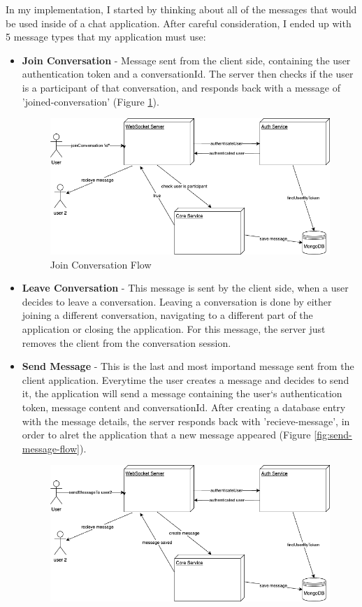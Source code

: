 In my implementation, I started by thinking about all of the messages that would be used inside of a chat application. After careful consideration, I ended up with 5 message types that my application must use:
\begin{itemize}
    \item \textbf{Join Conversation} - Message sent from the client side, containing the user authentication token and a conversationId. The server then checks if the user is a participant of that conversation, and responds back with a message of 'joined-conversation' (Figure \ref{fig:join-conversation-flow}).
    \begin{figure}[H]
        \centering
        \includegraphics[width=1\linewidth]{licenta-join-conversation.drawio.png}
        \caption{Join Conversation Flow}
        \label{fig:join-conversation-flow}
    \end{figure}
    \item \textbf{Leave Conversation} - This message is sent by the client side, when a user decides to leave a conversation. Leaving a conversation is done by either joining a different conversation, navigating to a different part of the application or closing the application. For this message, the server just removes the client from the conversation session.
    \item \textbf{Send Message} - This is the last and most importand message sent from the client application. Everytime the user creates a message and decides to send it, the application will send a message containing the user`s authentication token, message content and conversationId. After creating a database entry with the message details, the server responds back with 'recieve-message', in order to alret the application that a new message appeared (Figure \ref{fig:send-message-flow}).
    \begin{figure}[H]
        \centering
        \includegraphics[width=1\linewidth]{licenta-ws.drawio.png}

\end{figure}
\end{itemize}
